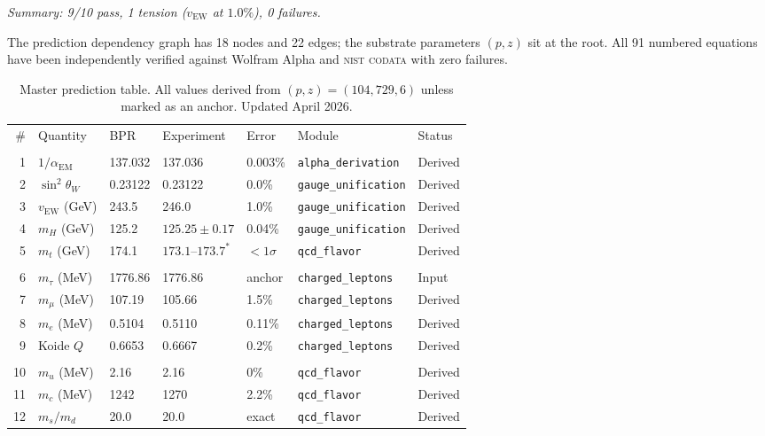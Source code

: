 \documentclass[aps,prd,twocolumn,superscriptaddress,longbibliography,nofootinbib]{revtex4-2}
\newcommand{\vEW}{v_{\mathrm{EW}}}
\newcommand{\sinW}{\sin^2\!\theta_W}
\newcommand{\alphaEM}{\alpha_{\mathrm{EM}}}
\begin{document}
\textit{Summary: 9/10 pass, 1 tension ($\vEW$ at $1.0\%$), 0 failures.}

The prediction dependency graph has 18 nodes and 22 edges; the substrate
parameters $(p, z)$ sit at the root.  All 91 numbered equations have been
independently verified against Wolfram Alpha and \textsc{nist codata}
with zero failures.

\begin{table}[t]
\caption{\label{tab:master}%
Master prediction table.  All values derived from $(p, z) = (104{,}729, 6)$
unless marked as an anchor.  Updated April 2026.}
\begin{ruledtabular}
\begin{tabular}{rllllll}
\# & Quantity & BPR & Experiment & Error & Module & Status \\
\colrule
\multicolumn{7}{c}{\textit{Electroweak}} \\
1  & $1/\alphaEM$ & 137.032 & 137.036 & 0.003\% & \texttt{alpha\_derivation} & Derived \\
2  & $\sinW$ & 0.23122 & 0.23122 & 0.0\% & \texttt{gauge\_unification} & Derived \\
3  & $\vEW$ (GeV) & 243.5 & 246.0 & 1.0\% & \texttt{gauge\_unification} & Derived \\
4  & $m_H$ (GeV) & 125.2 & $125.25\pm0.17$ & 0.04\% & \texttt{gauge\_unification} & Derived \\
5  & $m_t$ (GeV) & 174.1 & $173.1$--$173.7^*$ & $<1\sigma$ & \texttt{qcd\_flavor} & Derived \\
\colrule
\multicolumn{7}{c}{\textit{Charged Leptons}} \\
6  & $m_\tau$ (MeV) & 1776.86 & 1776.86 & anchor & \texttt{charged\_leptons} & Input \\
7  & $m_\mu$ (MeV) & 107.19 & 105.66 & 1.5\% & \texttt{charged\_leptons} & Derived \\
8  & $m_e$ (MeV) & 0.5104 & 0.5110 & 0.11\% & \texttt{charged\_leptons} & Derived \\
9  & Koide $Q$ & 0.6653 & 0.6667 & 0.2\% & \texttt{charged\_leptons} & Derived \\
\colrule
\multicolumn{7}{c}{\textit{Quarks}} \\
10 & $m_u$ (MeV) & 2.16 & 2.16 & 0\% & \texttt{qcd\_flavor} & Derived \\
11 & $m_c$ (MeV) & 1242 & 1270 & 2.2\% & \texttt{qcd\_flavor} & Derived \\
12 & $m_s/m_d$ & 20.0 & 20.0 & exact & \texttt{qcd\_flavor} & Derived \\

\end{tabular}
\end{ruledtabular}
\end{table}
\end{document}
